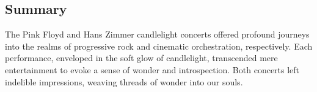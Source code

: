 \subsection{Summary}
The Pink Floyd and Hans Zimmer candlelight concerts offered profound journeys into the realms of progressive rock and cinematic orchestration, respectively. Each performance, enveloped in the soft glow of candlelight, transcended mere entertainment to evoke a sense of wonder and introspection. Both concerts left indelible impressions, weaving threads of wonder into our souls.

